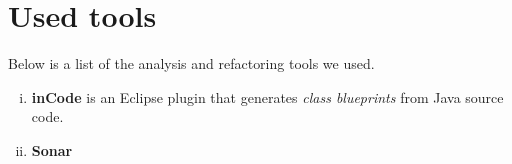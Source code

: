 \documentclass[a4paper, 10pt]{article}
\begin{document}
\newpage
\section{Used tools}
\label{sec:used_tools}

Below is a list of the analysis and refactoring tools we used.


\begin{enumerate}[i)]
\item \textbf{inCode} is an Eclipse plugin that generates \emph{class
    blueprints} from Java source code.
\item \textbf{Sonar}
\end{enumerate}


\end{document}
